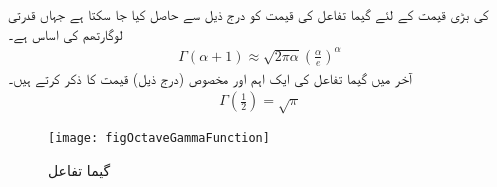  کی بڑی قیمت کے لئے گیما تفاعل کی قیمت کو درج ذیل سے حاصل کیا جا سکتا ہے جہاں  قدرتی لوگارتھم کی اساس ہے۔
\begin{align}
\Gamma(\alpha+1)\approx \sqrt{2\pi \alpha}\left(\frac{\alpha}{e}\right)^\alpha
\end{align}
آخر میں گیما تفاعل کی ایک اہم اور مخصوص (درج ذیل) قیمت کا ذکر کرتے ہیں۔
\begin{align}
\Gamma\left(\frac{1}{2}\right)=\sqrt{\pi}
\end{align}
%
\begin{figure}
\centering
\texttt{[image: figOctaveGammaFunction]}
\caption{گیما تفاعل}
\label{شکل_ضمیمہ_گیما_تفاعل}
\end{figure}
%

